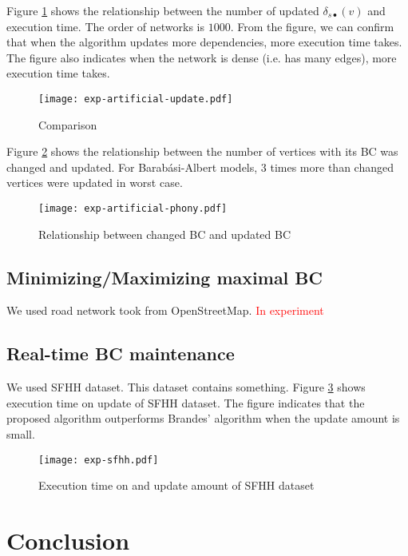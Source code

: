 \documentclass[twocolumn]{article}
\begin{document}
  Figure \ref{fig:exp-artificial-update} shows the relationship between the number of updated $\delta_{s\bullet}(v)$ and execution time.
  The order of networks is $1000$.
  From the figure, we can confirm that when the algorithm updates more dependencies, more execution time takes.
  The figure also indicates when the network is dense (i.e. has many edges), more execution time takes.

  \begin{figure}
    \centering
    \texttt{[image: exp-artificial-update.pdf]}
    \caption{Comparison}
    \label{fig:exp-artificial-update}
  \end{figure}

  Figure \ref{fig:exp-artificial-phony} shows the relationship between the number of vertices with its BC was changed and updated.
  For Barab{\'{a}}si-Albert models, $3$ times more than changed vertices were updated in worst case.

  \begin{figure}
    \centering
    \texttt{[image: exp-artificial-phony.pdf]}
    \caption{Relationship between changed BC and updated BC}
    \label{fig:exp-artificial-phony}
  \end{figure}

  \subsection*{Minimizing/Maximizing maximal BC}
  We used road network took from OpenStreetMap\cite{OpenStreetMap}.
  \textcolor{red}{In experiment}

  \subsection*{Real-time BC maintenance}
  We used SFHH dataset\cite{Genois2018}. This dataset contains something.
  Figure \ref{fig:exp-sfhh} shows execution time on update of SFHH dataset.
  The figure indicates that the proposed algorithm outperforms Brandes' algorithm when the update amount is small.

  \begin{figure}
    \centering
    \texttt{[image: exp-sfhh.pdf]}
    \caption{Execution time on and update amount of SFHH dataset}
    \label{fig:exp-sfhh}
  \end{figure}

  \section{Conclusion}

  \printbibliography[title=References]


\end{document}
